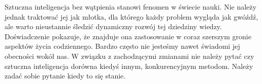 \documentclass[10pt, a4paper, twoside, notitlepage, openright]{article}
\begin{document}
  Sztuczna inteligencja bez wątpienia stanowi fenomen w świecie nauki. Nie należy jednak
  traktować jej jak młotka, dla którego każdy problem wygląda jak gwóźdź, ale warto
  nieustannie śledzić dynamiczny rozwój tej dziedziny wiedzy. Doświadczenie pokazuje,
  że znajduje ona zastosowanie w coraz szerszym gronie aspektów życia codziennego.
  Bardzo często nie jesteśmy nawet świadomi jej obecności wokół nas. W związku z
  zachodzącymi zmianami nie należy pytać czy sztuczna inteligencja dorówna kiedyś
  innym, konkurencyjnym metodom. Należy zadać sobie pytanie kiedy to się stanie.




\end{document}
